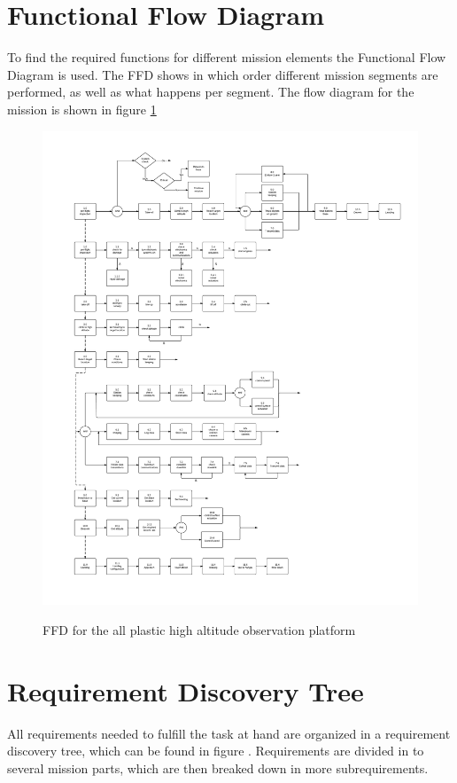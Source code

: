 \documentclass[a4paper]{report}
\begin{document}
\section{Functional Flow Diagram}\label{sec:FFD}
To find the required functions for different mission elements the Functional Flow Diagram is used. The FFD shows in which order different mission segments are performed, as well as what happens per segment. The flow diagram for the mission is shown in figure \ref{fig:FFD}

\begin{figure}[ht]
\includegraphics[width = \textwidth]{Figures/FFD.pdf}
\label{fig:FFD}
\caption{FFD for the all plastic high altitude observation platform}
\end{figure}

\section{Requirement Discovery Tree}\label{sec:RDT}
All requirements needed to fulfill the task at hand are organized in a requirement discovery tree, which can be found in figure \label{fig:RDT}. Requirements are divided in to several mission parts, which are then breaked down in more subrequirements. 
\end{document}

